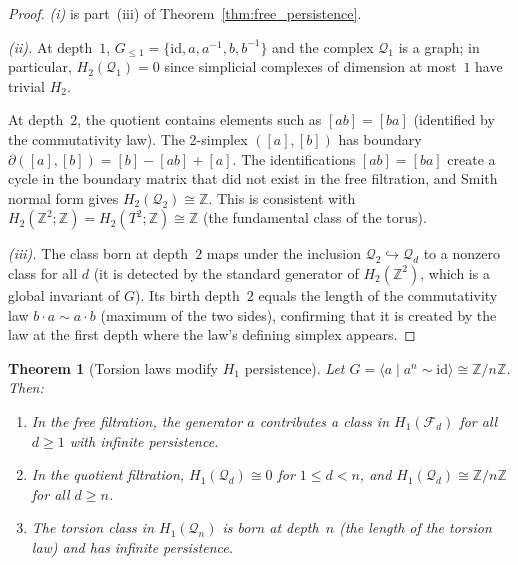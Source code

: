 \documentclass{article}
\newtheorem{theorem}{Theorem}[section]
\theoremstyle{definition}
\theoremstyle{remark}
\newcommand{\id}{\mathrm{id}}
\begin{document}
\begin{proof}
\textit{(i)} is part~(iii) of Theorem~\ref{thm:free_persistence}.

\textit{(ii).} At depth~$1$, $G_{\leq 1} = \{\id, a, a^{-1}, b,
b^{-1}\}$ and the complex $\mathcal{Q}_1$ is a graph; in
particular, $H_2(\mathcal{Q}_1) = 0$ since simplicial complexes
of dimension at most~$1$ have trivial $H_2$.

At depth~$2$, the quotient contains elements such as $[ab] = [ba]$
(identified by the commutativity law). The 2-simplex $([a],[b])$
has boundary $\partial([a],[b]) = [b] - [ab] + [a]$. The
identifications $[ab] = [ba]$ create a cycle in the boundary
matrix that did not exist in the free filtration, and Smith normal
form gives $H_2(\mathcal{Q}_2) \cong \mathbb{Z}$. This is
consistent with $H_2(\mathbb{Z}^2;\mathbb{Z}) = H_2(T^2;\mathbb{Z})
\cong \mathbb{Z}$ (the fundamental class of the torus).

\textit{(iii).} The class born at depth~$2$ maps under the
inclusion $\mathcal{Q}_2 \hookrightarrow \mathcal{Q}_d$ to a
nonzero class for all $d$ (it is detected by the standard
generator of $H_2(\mathbb{Z}^2)$, which is a global invariant
of $G$). Its birth depth~$2$ equals the length of the
commutativity law $b \cdot a \sim a \cdot b$ (maximum of the two
sides), confirming that it is created by the law at the first
depth where the law's defining simplex appears.
\end{proof}

\begin{theorem}[Torsion laws modify $H_1$ persistence]
\label{thm:torsion_persistence}
Let $G = \langle a \mid a^n \sim \id \rangle \cong \mathbb{Z}/n\mathbb{Z}$.
Then:
\begin{enumerate}[label=(\roman*)]
  \item In the free filtration, the generator $a$ contributes
        a class in $H_1(\mathcal{F}_d)$ for all $d \geq 1$ with
        infinite persistence.
  \item In the quotient filtration, $H_1(\mathcal{Q}_d) \cong 0$
        for $1 \leq d < n$, and $H_1(\mathcal{Q}_d) \cong
        \mathbb{Z}/n\mathbb{Z}$ for all $d \geq n$.
  \item The torsion class in $H_1(\mathcal{Q}_n)$ is born at
        depth~$n$ (the length of the torsion law) and has
        infinite persistence.
\end{enumerate}
\end{theorem}
\end{document}
